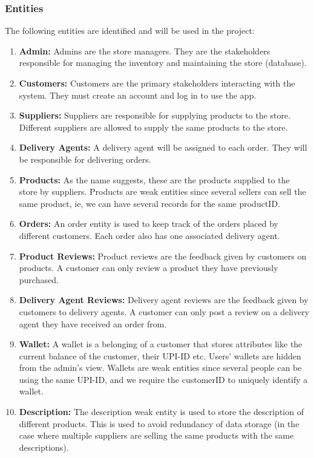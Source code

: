 \documentclass[12pt]{report}
\begin{document}
    \subsubsection*{Entities}
        The following entities are identified and will be used in the project:
        \begin{enumerate}
            \item \textbf{Admin:}
            Admins are the store managers.
            They are the stakeholders responsible for managing the inventory and maintaining the store (database).
            \item \textbf{Customers:}
            Customers are the primary stakeholders interacting with the system.
            They must create an account and log in to use the app.
            \item \textbf{Suppliers:}
            Suppliers are responsible for supplying products to the store.
            Different suppliers are allowed to supply the same products to the store.
            \item \textbf{Delivery Agents:}
            A delivery agent will be assigned to each order.
            They will be responsible for delivering orders.
            \item \textbf{Products:}
            As the name suggests, these are the products supplied to the store by suppliers.
            Products are weak entities since several sellers can sell the same product, ie, we can have several records for the same productID.
            \item \textbf{Orders:}
            An order entity is used to keep track of the orders placed by different customers.
            Each order also has one associated delivery agent.
            \item \textbf{Product Reviews:}
            Product reviews are the feedback given by customers on products.
            A customer can only review a product they have previously purchased.
            \item \textbf{Delivery Agent Reviews:}
            Delivery agent reviews are the feedback given by customers to delivery agents.
            A customer can only post a review on a delivery agent they have received an order from.
            \item \textbf{Wallet:}
            A wallet is a belonging of a customer that stores attributes like the current balance of the customer, their UPI-ID etc.
            Users' wallets are hidden from the admin's view. Wallets are weak entities since several people can be using the same UPI-ID, and we require the customerID to uniquely identify a wallet.
            \item \textbf{Description:}
            The description weak entity is used to store the description of different products.
            This is used to avoid redundancy of data storage (in the case where multiple suppliers are selling the same products with the same descriptions).
        \end{enumerate}
\end{document}
